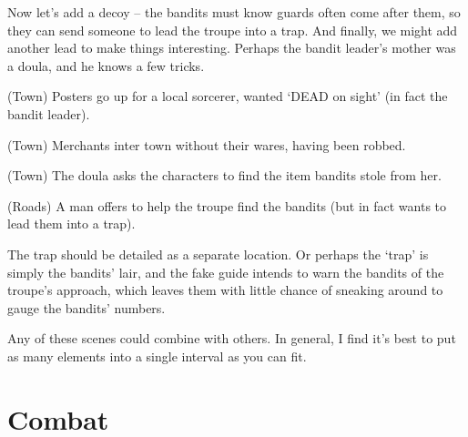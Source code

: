 \begin{multicols}{2}
\noindent
Now let's add a decoy -- the bandits must know \glspl{guard} often come after them, so they can send someone to lead the troupe into a trap.
And finally, we might add another lead to make things interesting.
Perhaps the bandit leader's mother was a doula, and he knows a few tricks.

\begin{list}{\sqn}{}
  \item
  (Town)
  Posters go up for a local sorcerer, wanted `DEAD on sight' (in fact the bandit leader).
  \item
  (Town) 
  Merchants inter town without their wares, having been robbed.
  \item
  (Town)
  The doula asks the characters to find the item bandits stole from her.
  \item
  (Roads)
  A man offers to help the troupe find the bandits (but in fact wants to lead them into a trap).
\end{list}

\noindent
The trap should be detailed as a separate location.
Or perhaps the `trap' is simply the bandits' lair, and the fake guide intends to warn the bandits of the troupe's approach, which leaves them with little chance of sneaking around to gauge the bandits' numbers.

Any of these scenes could combine with others.
In general, I find it's best to put as many elements into a single \gls{interval} as you can fit.

\end{multicols}

\section{Combat}

